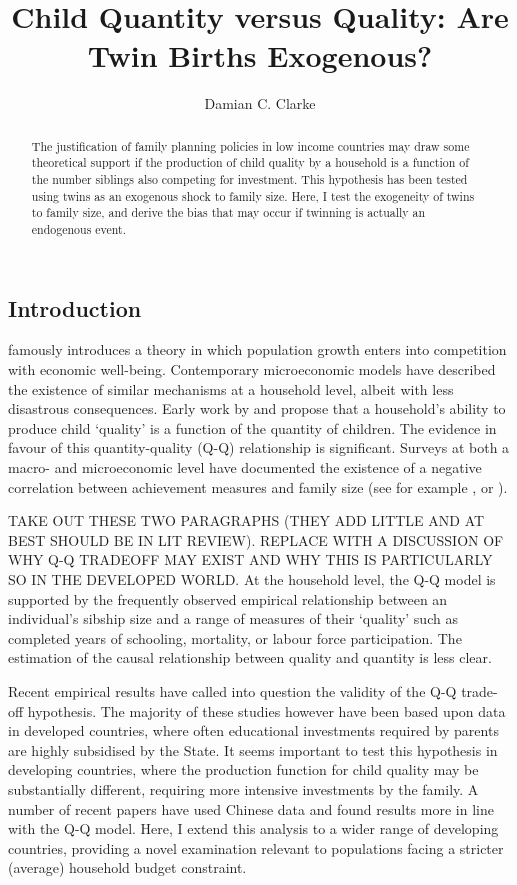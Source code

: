 \documentclass{article}[11pt,subeqn]
\title{Child Quantity versus Quality: Are Twin Births Exogenous?}
\author{Damian C. Clarke}
\begin{document}
\linenumbers
\begin{spacing}{1.25}

\maketitle
\begin{abstract}
The justification of family planning policies in low income countries may draw some theoretical support 
if the production of child quality by a household is a function of the number siblings also competing
for investment.  This hypothesis has been tested using twins as an exogenous shock to family size.  Here, I test
the exogeneity of twins to family size, and derive the bias that may occur if twinning is actually
an endogenous event.  
\end{abstract}

\section{Introduction}
\citet{Malthus1798} famously introduces a theory in which population growth enters into competition with economic   
well-being. Contemporary microeconomic models have described the existence of similar mechanisms at a household level, albeit with less disastrous consequences.  Early work by \citet{BeckerLewis1973} and \citet{BeckerTomes1976} propose that a household's ability to produce child `quality' is a function of the quantity of children.  The evidence in favour of this quantity-quality (Q-Q) relationship is significant.  Surveys at both a macro- and microeconomic level have documented the existence of a negative correlation between achievement measures and family size (see for example \cite{Desai1995}, or \cite{Hanushek1992}).

TAKE OUT THESE TWO PARAGRAPHS (THEY ADD LITTLE AND AT BEST SHOULD BE IN LIT REVIEW).  REPLACE WITH A DISCUSSION OF WHY Q-Q TRADEOFF MAY EXIST AND WHY THIS IS PARTICULARLY SO IN THE DEVELOPED WORLD.
At the household level, the Q-Q model is supported by the frequently observed empirical relationship between an individual's sibship size and a
range of measures of their `quality' such as completed years of schooling, mortality, or labour force participation.
The estimation of the causal relationship between quality and quantity is less clear. 

Recent empirical results have called into question the validity of the Q-Q trade-off hypothesis.  The majority of
these studies however have been based upon data in developed countries, where often educational investments
required by parents are highly subsidised by the State.  It seems important to test this hypothesis in developing
countries, where the production function for child quality may be substantially different, requiring more intensive
investments by the family.  A number of recent papers have used Chinese data and found results
more in line with the Q-Q model.  Here, I extend this analysis to a wider range of developing countries, providing
a novel examination relevant to populations facing a stricter (average) household budget constraint.
\vspace{-5mm}

\end{spacing}
\end{document}
